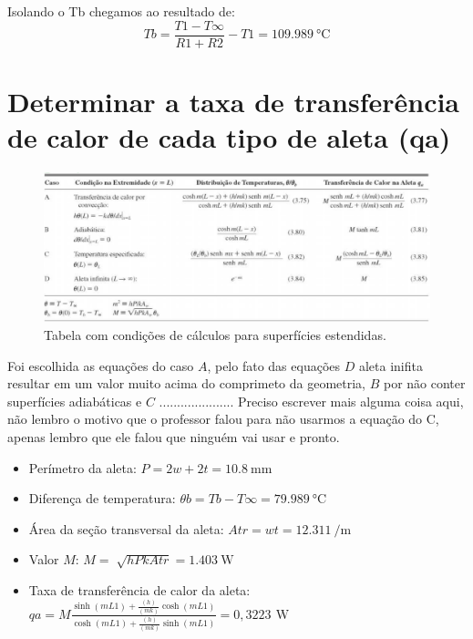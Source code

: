 Isolando o Tb chegamos ao resultado de:
\begin{equation}
    {Tb}={\frac{T1 -T\infty}{{R1}+{R2}}}-{T1} = \SI{109,989}{\degreeCelsius}
\end{equation}

\clearpage

\section{Determinar a taxa de transferência de calor de cada tipo de aleta (qa)}\label{sec:calcTable}

\begin{figure}[h]
    \centering
    \caption{Tabela com condições de cálculos para superfícies estendidas.}
    \label{fig:tabelaCasosCalc}
    \includegraphics[width=15cm]{figuras/tabelaCasosCalc.jpg}
    \fonteproprioautor
\end{figure}

Foi escolhida as equações do caso \(A\), pelo fato das equações
\(D\) aleta inifita resultar em um valor muito acima do comprimeto da
geometria,
\(B\) por não conter superfícies adiabáticas
e \(C\) ..................... Preciso escrever mais alguma coisa aqui, não lembro o motivo que o professor falou para não usarmos a equação do C, apenas lembro que ele falou que ninguém vai usar e pronto.

\begin{itemize}[leftmargin=2cm]
    \item Perímetro da aleta: \(
          {P}={2w+2t} = \SI{10,8}{\milli\meter}
          \)
    \item Diferença de temperatura: \(
          {\theta}b={{Tb}-{T\infty}} = \SI{79,989}{\degreeCelsius}
          \)
    \item Área da seção transversal da aleta: \(
          {Atr}={{w}{t}} = \SI{12,311}{\per\meter}
          \)
    \item Valor \(M\): \(
          {M}={\sqrt[]{{h}{P}{k}{Atr}}} = \SI{1,403}{\watt}
          \)
    \item Taxa de transferência
          de calor da aleta: \\\(
          {qa}={M}{
          \frac
          {\sinh{(mL1)}+{\frac{(h)}{(mk)}}{\cosh{(mL1)}}}
          {\cosh{(mL1)}+{\frac{(h)}{(mk)}}{\sinh{(mL1)}}}
          }={0,3223\,\SI{}{\watt}}
          \)
\end{itemize}

